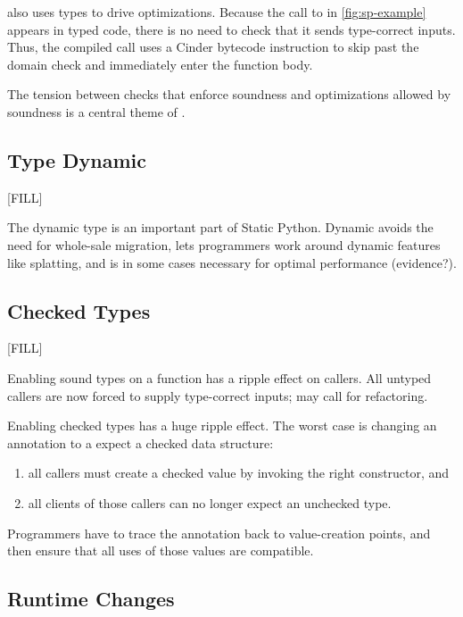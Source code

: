 \documentclass[a4paper,english,cleveref,autoref,thm-restate,anonymous,]{lipics-v2021}
\begin{document}
\SP{} also uses types to drive optimizations.
Because the call to  in \cref{fig:sp-example} appears in typed code,
there is no need to check that it sends type-correct inputs.
Thus, the compiled call uses a Cinder bytecode instruction to skip past the
domain check and immediately enter the function body.

The tension between checks that enforce soundness and optimizations allowed by soundness
is a central theme of \SP{}.




\subsection{Type Dynamic}

[FILL]

The dynamic type is an important part of Static Python.
Dynamic avoids the need for whole-sale migration,
lets programmers work around dynamic features like splatting,
and is in some cases necessary for optimal performance (evidence?).


\subsection{Checked Types}

[FILL]

Enabling sound types on a function has a ripple effect on callers.
All untyped callers are now forced to supply type-correct inputs; may call for
refactoring.

Enabling checked types has a huge ripple effect.
The worst case is changing an annotation to a expect a checked data structure:
\begin{enumerate}
  \item all callers must create a checked value by invoking the right constructor, and
  \item all clients of those callers can no longer expect an unchecked type.
\end{enumerate}
Programmers have to trace the annotation back to value-creation points, and then
ensure that all uses of those values are compatible.


\subsection{Runtime Changes}
\end{document}

